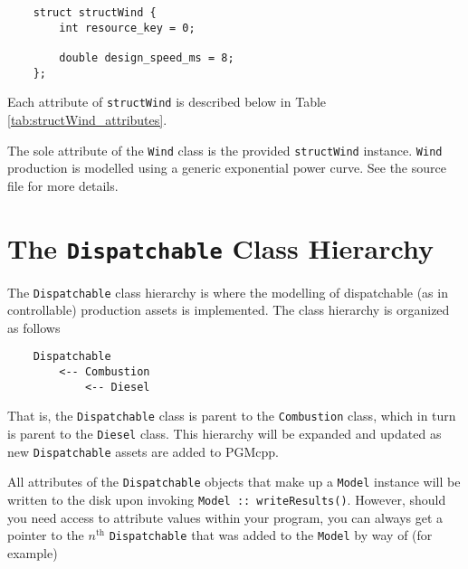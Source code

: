 \documentclass[12pt, letterpaper]{report}
\begin{document}
\begin{verbatim}
    struct structWind {
        int resource_key = 0;
        
        double design_speed_ms = 8;
    };
\end{verbatim}

\noindent Each attribute of \texttt{structWind} is described below in Table \ref{tab:structWind_attributes}.

\begin{table}[H]
    \centering
    \caption{\texttt{structWind} attribute descriptions}
    \label{tab:structWind_attributes}
\end{table}

\noindent The sole attribute of the \texttt{Wind} class is the provided \texttt{structWind} instance. \texttt{Wind} production is modelled using a generic exponential power curve. See the source file for more details.

\chapter{The \texttt{Dispatchable} Class Hierarchy}

The \texttt{Dispatchable} class hierarchy is where the modelling of dispatchable (as in controllable) production assets is implemented. The class hierarchy is organized as follows

\begin{verbatim}
    Dispatchable
        <-- Combustion
            <-- Diesel
\end{verbatim}

\noindent That is, the \texttt{Dispatchable} class is parent to the \texttt{Combustion} class, which in turn is parent to the \texttt{Diesel} class. This hierarchy will be expanded and updated as new \texttt{Dispatchable} assets are added to PGMcpp. \par
All attributes of the \texttt{Dispatchable} objects that make up a \texttt{Model} instance will be written to the disk upon invoking \texttt{Model :: writeResults()}. However, should you need access to attribute values within your program, you can always get a pointer to the $n^\textrm{th}$ \texttt{Dispatchable} that was added to the \texttt{Model} by way of (for example)
\end{document}
